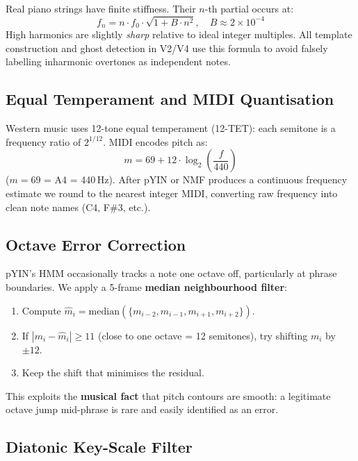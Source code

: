 \documentclass[12pt, a4paper]{article}
\begin{document}
Real piano strings have finite stiffness. Their $n$-th partial occurs at:
\begin{equation}
  f_n = n\cdot f_0\cdot\sqrt{1 + B\cdot n^2}, \quad B \approx 2\times10^{-4}
\end{equation}
High harmonics are slightly \emph{sharp} relative to ideal integer multiples.
All template construction and ghost detection in V2/V4 use this formula
to avoid falsely labelling inharmonic overtones as independent notes.

\subsection{Equal Temperament and MIDI Quantisation}

Western music uses 12-tone equal temperament (12-TET): each semitone is a
frequency ratio of $2^{1/12}$. MIDI encodes pitch as:
\begin{equation}
  m = 69 + 12\cdot\log_2\!\left(\frac{f}{440}\right)
\end{equation}
($m = 69$ = A4 = 440\,Hz). After pYIN or NMF produces a continuous
frequency estimate we round to the nearest integer MIDI, converting raw
frequency into clean note names (C4, F\#3, etc.).

\subsection{Octave Error Correction}

pYIN's HMM occasionally tracks a note one octave off, particularly at
phrase boundaries. We apply a 5-frame \textbf{median neighbourhood filter}:
\begin{enumerate}[leftmargin=2em]
  \item Compute $\hat{m}_i = \text{median}(\{m_{i-2}, m_{i-1}, m_{i+1}, m_{i+2}\})$.
  \item If $|m_i - \hat{m}_i| \geq 11$ (close to one octave = 12 semitones),
        try shifting $m_i$ by $\pm12$.
  \item Keep the shift that minimises the residual.
\end{enumerate}
This exploits the \textbf{musical fact} that pitch contours are smooth:
a legitimate octave jump mid-phrase is rare and easily identified as an error.

\subsection{Diatonic Key-Scale Filter}
\end{document}
